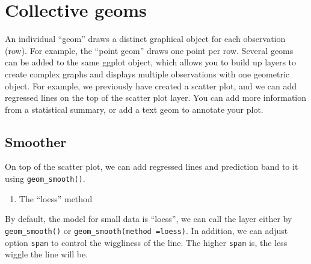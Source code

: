 \documentclass[]{book}
\newenvironment{Shaded}{\begin{snugshade}}{\end{snugshade}}
\newcommand{\KeywordTok}[1]{\textcolor[rgb]{0.13,0.29,0.53}{\textbf{#1}}}
\newcommand{\DataTypeTok}[1]{\textcolor[rgb]{0.13,0.29,0.53}{#1}}
\newcommand{\DecValTok}[1]{\textcolor[rgb]{0.00,0.00,0.81}{#1}}
\newcommand{\FloatTok}[1]{\textcolor[rgb]{0.00,0.00,0.81}{#1}}
\newcommand{\StringTok}[1]{\textcolor[rgb]{0.31,0.60,0.02}{#1}}
\newcommand{\CommentTok}[1]{\textcolor[rgb]{0.56,0.35,0.01}{\textit{#1}}}
\newcommand{\OperatorTok}[1]{\textcolor[rgb]{0.81,0.36,0.00}{\textbf{#1}}}
\newcommand{\NormalTok}[1]{#1}
\providecommand{\tightlist}{%
  \setlength{\itemsep}{0pt}\setlength{\parskip}{0pt}}
\begin{document}
\section{Collective geoms}\label{collective-geoms}

An individual ``geom'' draws a distinct graphical object for each
observation (row). For example, the ``point geom'' draws one point per
row. Several geoms can be added to the same ggplot object, which allows
you to build up layers to create complex graphs and displays multiple
observations with one geometric object. For example, we previously have
created a scatter plot, and we can add regressed lines on the top of the
scatter plot layer. You can add more information from a statistical
summary, or add a text geom to annotate your plot.

\subsection{Smoother}\label{smoother}

On top of the scatter plot, we can add regressed lines and prediction
band to it using \texttt{geom\_smooth()}.

\begin{enumerate}
\def\labelenumi{\arabic{enumi}.}
\tightlist
\item
  The ``loess'' method
\end{enumerate}

By default, the model for small data is ``loess'', we can call the layer
either by \texttt{geom\_smooth()} or
\texttt{geom\_smooth(method\ =\textquotesingle{}loess\textquotesingle{})}.
In addition, we can adjust option \texttt{span} to control the
wiggliness of the line. The higher \texttt{span} is, the less wiggle the
line will be.

\begin{Shaded}
\end{Shaded}
\end{document}
